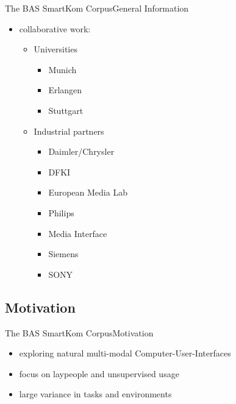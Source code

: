 \documentclass{beamer}
\begin{document}
			\begin{frame}{The BAS SmartKom Corpus}{General Information}			
				\begin{itemize}
					\item collaborative work:
					\begin{itemize}
						\item Universities
						\begin{itemize}
							\item Munich
							\item Erlangen
							\item Stuttgart
						\end{itemize}
						\item Industrial partners
						\begin{itemize}
							\item Daimler/Chrysler
							\item DFKI
							\item European Media Lab
							\item Philips
							\item Media Interface
							\item Siemens
							\item SONY
						\end{itemize}
					\end{itemize}
				\end{itemize}											
			\end{frame}		
			
		\subsection{Motivation}
			\begin{frame}{The BAS SmartKom Corpus}{Motivation}			
				\begin{itemize}
					\item exploring natural multi-modal Computer-User-Interfaces
					\item focus on laypeople and unsupervised usage
					\item large variance in tasks and environments
				\end{itemize}											
			\end{frame}		
				
\end{document}
